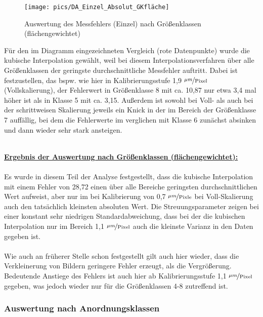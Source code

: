 \documentclass[
fontsize=10pt, 
listof = totoc,
parskip = half	
]{report}
\begin{document}
\begin{figure}[H]
	\centering
	\texttt{[image: pics/DA\_Einzel\_Absolut\_GKfläche]}
	\caption{Auswertung des Messfehlers (Einzel) nach Größenklassen (flächengewichtet)}
	\label{fig:DAEinzelAbsolutGKflaeche}
\end{figure}

\noindent Für den im Diagramm eingezeichneten Vergleich (rote Datenpunkte) wurde die kubische Interpolation gewählt, weil bei diesem Interpolationsverfahren über alle Größenklassen der geringste durchschnittliche Messfehler auftritt. Dabei ist festzustellen, das bspw. wie hier in Kalibrierungsstufe 1,9 $\nicefrac{\mu m}{\text{Pixel}}$ (Vollskalierung), der Fehlerwert in Größenklasse 8 mit ca. 10,87 nur etwa 3,4 mal höher ist als in Klasse 5 mit ca. 3,15. Außerdem ist sowohl bei Voll- als auch bei der schrittweisen Skalierung jeweils ein Knick in der im Bereich der Größenklasse 7 auffällig, bei dem die Fehlerwerte im verglichen mit Klasse 6 zunächst absinken und dann wieder sehr stark ansteigen. 
\\\\
\colorbox{gray!10}{
	\label{box:Ergebnis der Auswertung nach Größenklassen (flächengewichtet):}
	\begin{minipage}{0.975\textwidth}
		\textbf{\underline{Ergebnis der Auswertung nach Größenklassen (flächengewichtet):}}
		\\\\
		Es wurde in diesem Teil der Analyse festgestellt, dass die kubische Interpolation mit einem  Fehler von 28,72 einen über alle Bereiche geringsten durchschnittlichen Wert aufweist, aber nur im bei Kalibrierung von 0,7 $\nicefrac{\mu m}{\text{Pixle}}$ bei Voll-Skalierung auch den tatsächlich kleinsten absoluten Wert. Die Streuungsparameter zeigen bei einer konstant sehr niedrigen Standardabweichung, dass bei der die kubischen Interpolation nur im Bereich 1,1 $\nicefrac{\mu m}{\text{Pixel}}$ auch die kleinste Varianz in den Daten gegeben ist.
		\\\\
		Wie auch an früherer Stelle schon festgestellt gilt auch hier wieder, dass die Verkleinerung von Bildern geringere Fehler erzeugt, als die Vergrößerung. Bedeutende Anstiege des Fehlers ist auch hier ab Kalibrierungsstufe 1,1 $\nicefrac{\mu m}{\text{Pixel}}$ gegeben, was jedoch wieder nur für die Größenklassen 4-8 zutreffend ist.
	\end{minipage}
}
	
\subsubsection{Auswertung nach Anordnungsklassen}
\end{document}
